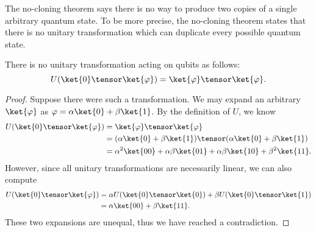\begin{definition}
The no-cloning theorem says there is no way to produce two copies of a single 
arbitrary quantum state. To be more precise, the no-cloning theorem states that
there is no unitary transformation which can duplicate every possible quantum state.

\begin{theorem}
    There is no unitary transformation acting on qubits as follows:
    \[ U(\ket{0}\tensor\ket{\varphi}) = \ket{\varphi}\tensor\ket{\varphi}.\]
\end{theorem}
\begin{proof}
    Suppose there were such a transformation. We may expand an arbitrary $\ket{\varphi}$
    as $\varphi = \alpha\ket{0} + \beta\ket{1}$. By the definition of $U$, we know
    \begin{align*} 
        U(\ket{0} \tensor \ket{\varphi})
        &= \ket{\varphi} \tensor \ket{\varphi} \\
        &= (\alpha\ket{0} + \beta\ket{1}) \tensor (\alpha\ket{0} + \beta\ket{1}) \\
        &= \alpha^2 \ket{00} + \alpha\beta\ket{01} + \alpha\beta\ket{10} + \beta^2\ket{11}.
    \end{align*}
    However, since all unitary transformations are necessarily linear, we can also compute
    \begin{align*}
        U(\ket{0} \tensor \ket{\varphi})
        &= \alpha U(\ket{0} \tensor \ket{0}) + \beta U(\ket{0} \tensor \ket{1}) \\
        &= \alpha \ket{00} + \beta \ket{11}.
    \end{align*}
    These two expansions are unequal, thus we have reached a contradiction. 
\end{proof}



\end{definition}


